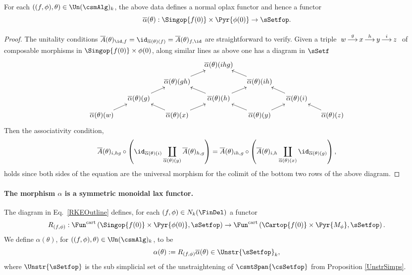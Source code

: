 \documentclass[a4paper]{article}
\numberwithin{equation}{section}
\begin{document}
\begin{lem}
 For each $((f,\phi), \theta) \in \Un(\csmAlg)_k$, the above data defines a normal oplax functor and hence a functor
 \begin{equation*}
  \overline{\alpha}(\theta): \Singop{f(0)}\times \Pyr{\phi(0)} \to \sSetfop.
 \end{equation*}
\end{lem}
\begin{proof}
 The unitality conditions $\overline{A}(\theta)_{\id, f} = \id_{\overline{\alpha}(\theta)(f)}=\overline{A}(\theta)_{f, \id}$ are straightforward to verify. Given a triple $\xymatrixcolsep{1.1pc} \xymatrix{w \ar[r]^-g & x \ar[r]^-h & y \ar[r]^-i & z}$ of composable morphisms in $\Singop{f(0)}\times\phi(0)$, along similar lines as above one has a diagram in $\sSetf$
 \begin{equation*}
 \xymatrixrowsep{.7pc}\xymatrixcolsep{1.2pc} \xymatrix{ & & & \overline{\alpha}(\theta)(ihg) & & & \\
 & & \overline{\alpha}(\theta)(gh) \ar[ru] & & \overline{\alpha}(\theta)(ih) \ar[lu] & & \\
 & \overline{\alpha}(\theta)(g) \ar[ru] & & \overline{\alpha}(\theta)(h) \ar[ru] \ar[lu] & & \overline{\alpha}(\theta)(i) \ar[lu] & \\
 \overline{\alpha}(\theta)(w) \ar[ru] & & \overline{\alpha}(\theta)(x) \ar[ru] \ar[lu] & & \overline{\alpha}(\theta)(y) \ar[ru] \ar[lu] & & \overline{\alpha}(\theta)(z) \ar[lu] }
\end{equation*}
Then the associativity condition,
\begin{equation*}
  \overline{A}(\theta)_{i,hg} \circ \left(\id_{\overline{\alpha}(\theta)(i)} \coprod_{\overline{\alpha}(\theta)(y)} \overline{A}(\theta)_{h,g}\right)= \overline{A}(\theta)_{ih,g} \circ \left( \overline{A}(\theta)_{i,h} \coprod_{\overline{\alpha}(\theta)(x)} \id_{\overline{\alpha}(\theta)(g)}\right),
\end{equation*}
holds since both sides of the equation are the universal morphism for the colimit of the bottom two rows of the above diagram.
\end{proof}



\paragraph{The morphism $\alpha$ is a symmetric monoidal lax functor.} The diagram in Eq.~\ref{RKEOutline} defines, for each $(f,\phi) \in N_k(\FinDel)$ a functor
\begin{equation*}
 R_{(f,\phi)}: \Fun^{\rm cart}\left(\Singop{f(0)}\times \Pyr{\phi(0)}, \sSetfop\right) \to \Fun^{\rm cart}\left( \Cartop{f(0)}\times \Pyr{M_\phi}, \sSetfop \right).
\end{equation*}
We define $\alpha(\theta)$, for $((f,\phi),\theta)\in \Un(\csmAlg)_k$, to be
\begin{equation*}
 \alpha(\theta):= R_{(f,\phi)} \overline{\alpha}(\theta) \in \Unstr{\sSetfop}_k,
\end{equation*}
where $\Unstr{\sSetfop}$ is the sub simplicial set of the unstraightening of $\csmtSpan{\csSetfop}$ from Proposition \ref{UnstrSimps}.
\end{document}

